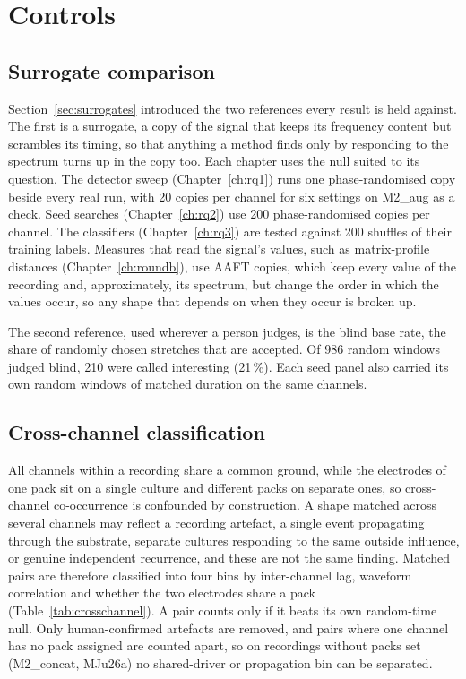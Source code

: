 \section{Controls}
\label{sec:controls}

\subsection{Surrogate comparison}

Section~\ref{sec:surrogates} introduced the two references every result is held against. The first is a surrogate, a copy of the signal that keeps its frequency content but scrambles its timing, so that anything a method finds only by responding to the spectrum turns up in the copy too. Each chapter uses the null suited to its question. The detector sweep (Chapter~\ref{ch:rq1}) runs one phase-randomised copy beside every real run, with 20 copies per channel for six settings on M2\_aug as a check. Seed searches (Chapter~\ref{ch:rq2}) use 200 phase-randomised copies per channel. The classifiers (Chapter~\ref{ch:rq3}) are tested against 200 shuffles of their training labels. Measures that read the signal's values, such as matrix-profile distances (Chapter~\ref{ch:roundb}), use AAFT copies, which keep every value of the recording and, approximately, its spectrum, but change the order in which the values occur, so any shape that depends on when they occur is broken up.

The second reference, used wherever a person judges, is the blind base rate, the share of randomly chosen stretches that are accepted. Of 986 random windows judged blind, 210 were called interesting (21\,\%). Each seed panel also carried its own random windows of matched duration on the same channels.

\subsection{Cross-channel classification}
\label{sec:crosschannel}

All channels within a recording share a common ground, while the electrodes of one pack sit on a single culture and different packs on separate ones, so cross-channel co-occurrence is confounded by construction. A shape matched across several channels may reflect a recording artefact, a single event propagating through the substrate, separate cultures responding to the same outside influence, or genuine independent recurrence, and these are not the same finding. Matched pairs are therefore classified into four bins by inter-channel lag, waveform correlation and whether the two electrodes share a pack (Table~\ref{tab:crosschannel}). A pair counts only if it beats its own random-time null. Only human-confirmed artefacts are removed, and pairs where one channel has no pack assigned are counted apart, so on recordings without packs set (M2\_concat, MJu26a) no shared-driver or propagation bin can be separated.

